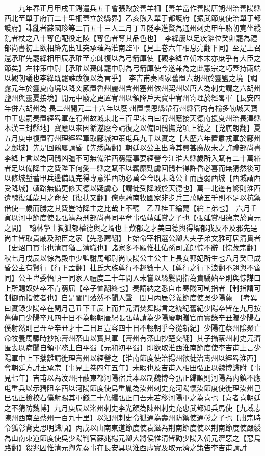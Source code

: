　　九年春正月甲戌王鍔遣兵五千會張煦於善羊柵【善羊當作善陽唐朔州治善陽縣西北至單于府百二十里柵蓋立於縣界】乙亥煦入單于都護府【振武節度使治單于都護府】誅亂者蘇國珍等二百五十三人二月丁丑貶李進賢為通州刺史甲午駱朝寛坐縱亂者杖之八十奪色配役定陵【奪色者奪其品色也】　李絳屢以足疾辭位癸卯罷為禮部尚書初上欲相絳先出吐突承璀為淮南監軍【見上卷六年相息亮翻下同】至是上召還承璀先罷絳相甲辰承璀至京師復以為弓箭庫使【觀李絳立朝本末亦庶乎有大臣之節矣】左神策中尉【承璀以喪師罷中尉為弓箭庫使今遂兼為之此憲宗之巧蓋持兩端以觀朝議也李絳既罷誰敢復以為言乎】　李吉甫奏國家舊置六胡州於靈鹽之境【調露元年於靈夏南境以降突厥置魯州麗州含州塞州依州契州以唐人為刺史謂之六胡州鹽州與靈夏接境】開元中廢之更置宥州以領降戶天寶中宥州寄理於經畧軍【長安四年併六胡州為長二州開元二十六年以廢州置懷恩縣帶宥州縣管内有榆多勒城天寶中王忠嗣奏置經畧軍在宥州故城東北三百里宋白曰宥州應接天德南援夏州治長澤縣本漢三封縣地】寶應以來因循遂廢今請復之以備回鶻撫党項上從之【党㡳朗翻】夏五月庚申復置宥州理經畧軍取鄜城神策屯兵九千以實之【大歷六年置肅戎軍於鄜州之鄜城】先是回鶻屢請昏【先悉薦翻】朝廷以公主出降其費甚廣故未之許禮部尚書李絳上言以為回鶻凶彊不可無備淮西窮蹙事要經營今江淮大縣歲所入賦有二十萬緡者足以備降主之費陛下何愛一縣之賦不以羈縻勁虜回鶻若得許昏必喜而無猜然後可以修城塹蓄甲兵邊備既完得專意淮西功必萬全今既未降公主而虛弱西城【西城謂西受降城】磧路無備更修天德以疑虜心【謂徙受降城於天德也】萬一北邊有驚則淮西遺醜復延歲月之命矣【復扶又翻】儻虜騎南牧國家非步兵三萬騎五千則不足以抗禦借使一歲而勝之其費豈特降主之比哉上不聽　乙丑桂王綸薨【綸上弟也】　六月壬寅以河中節度使張弘靖為刑部尚書同平章事弘靖延賞之子也【張延賞相德宗於貞元之間】　翰林學士獨狐郁權德輿之壻也上歎郁之才美曰德輿得壻郁我反不及邪先是尚主皆取貴戚及勲臣之家【先悉薦翻】上始命宰相選公卿大夫子弟文雅可居清貫者【史炤曰貫事也清貫猶言清職也】諸家多不願惟杜佑孫司議郎悰不辭【悰藏宗翻】秋七月戊辰以悰為殿中少監駙馬都尉尚岐陽公主公主上長女郭妃所生也八月癸巳成昏公主有賢行【行下孟翻】杜氏大族尊行不趐數十人【尊行之行下浪翻不趐與不啻同】公主卑委怡順一同家人禮度二十年間人未嘗以絲髪間指為貴驕始至則與悰謀曰上所賜奴婢卒不肯窮屈【卒子恤翻終也】奏請納之悉自市寒賤可制指者【制指謂可制御而指使者也】自是閨門落然不聞人聲　閏月丙辰彰義節度使吳少陽薨　【考異曰實録少陽卒在閏月己丑下壬辰上而并元濟焚舞陽言之統紀舊紀少陽卒皆在九月按舊傳曰少陽卒凡四十日不為輟朝唐紀張弘靖請為少陽廢朝贈官而實錄辛丑贈少陽右僕射然則己丑至辛丑才十二日耳豈容四十日不輟朝乎今從新紀】少陽在蔡州隂聚亡命牧養馬騾時抄掠壽州茶山以實其軍【壽州有茶山抄楚交翻】其子攝蔡州刺史元濟匿喪以病聞自領軍務上自平蜀【元和初平蜀】即欲取淮西淮南節度使李吉甫上言少陽軍中上下攜離請徙理壽州以經營之【淮南節度使治揚州欲徙治夀州以經畧淮西】會朝廷方討王承宗【事見上卷四年五年】未暇也及吉甫入相田弘正以魏博歸附【事見七年】吉甫以為汝州扞蔽東都河陽宿兵本以制魏博今弘正歸順則河陽為内鎮不應屯重兵以示猜阻辛酉以河陽節度使烏重胤為汝州刺史充河陽懷汝節度使徙理汝州己巳弘正檢校右僕射賜其軍錢二十萬緡弘正曰吾未若移河陽軍之為喜也【喜者喜朝廷之不猜防魏博】九月庚辰以洺州刺史李光顔為陳州刺史充忠武都知兵馬使【九域志陳州西南至蔡州一百九十里】以泗州刺史令狐通為壽州防禦使通彰之子也【肅宗時令狐彰背史思明歸順】丙戌以山南東道節度使袁滋為荆南節度使以荆南節度使嚴綬為山南東道節度使吳少陽判官蘇兆楊元卿大將侯惟清皆勸少陽入朝元濟惡之【惡烏路翻】殺兆囚惟清元卿先奏事在長安具以淮西虛實及取元濟之策告李吉甫請討